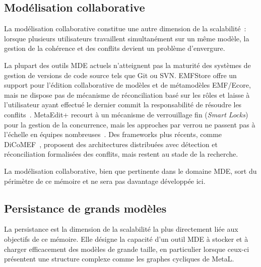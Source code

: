 \subsection{Modélisation collaborative}
\label{sec:model-collaborative}

La modélisation collaborative constitue une autre dimension de la scalabilité~: lorsque plusieurs utilisateurs travaillent simultanément sur un même modèle, la gestion de la cohérence et des conflits devient un problème d'envergure.

La plupart des outils MDE actuels n'atteignent pas la maturité des systèmes de gestion de versions de code source tels que Git ou SVN. EMFStore offre un support pour l'édition collaborative de modèles et de métamodèles EMF/Ecore, mais ne dispose pas de mécanisme de réconciliation basé sur les rôles et laisse à l'utilisateur ayant effectué le dernier commit la responsabilité de résoudre les conflits~\cite{koshima2016distributed}. MetaEdit+ recourt à un mécanisme de verrouillage fin (\textit{Smart Locks}) pour la gestion de la concurrence, mais les approches par verrou ne passent pas à l'échelle en équipes nombreuses~\cite{koshima2016distributed}. Des frameworks plus récents, comme DiCoMEF~\cite{koshima2016distributed}, proposent des architectures distribuées avec détection et réconciliation formalisées des conflits, mais restent au stade de la recherche.

La modélisation collaborative, bien que pertinente dans le domaine MDE, sort du périmètre de ce mémoire et ne sera pas davantage développée ici.

\subsection{Persistance de grands modèles}
\label{sec:persistance-modeles}

La persistance est la dimension de la scalabilité la plus directement liée aux objectifs de ce mémoire. Elle désigne la capacité d'un outil MDE à stocker et à charger efficacement des modèles de grande taille, en particulier lorsque ceux-ci présentent une structure complexe comme les graphes cycliques de MetaL.

